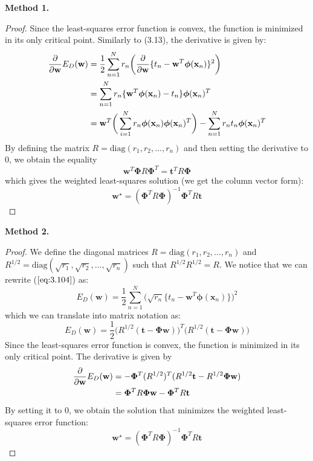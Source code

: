 \vspace{1em}

\textbf{Method 1.}

\begin{proof}
    Since the least-squares error function is convex,
    the function is minimized in its only critical 
    point. Similarly to (3.13), the derivative is given by:
    \begin{align*}
        \pdv{\mathbf{w}} E_D(\mathbf{w})
        &= \frac{1}{2} \sum_{n=1}^{N} r_n \bigg(\pdv{\mathbf{w}} 
        \{t_n - \mathbf{w}^T \bm{\phi}(\mathbf{x}_n)\}^2\bigg) \\
        &= \sum_{n=1}^N r_n \{\mathbf{w}^T \bm{\phi}(\mathbf{x}_n) - t_n\} 
        \bm{\phi}(\mathbf{x}_n)^T \\
        &= \mathbf{w}^T 
        \bigg(\sum_{i=1}^{N} r_n \bm{\phi}(\mathbf{x}_n)
        \bm{\phi}(\mathbf{x}_n)^T\bigg) -
        \sum_{n=1}^{N} r_n t_n \bm{\phi}(\mathbf{x}_n)^T
    \end{align*}
    By defining the matrix $R = \text{diag}(r_1, r_2, \ldots, r_n)$
    and then setting the derivative to 0, we obtain the equality
    \[
        \mathbf{w}^T \mathbf{\Phi}R\mathbf{\Phi}^T
        = \mathbf{t}^TR\mathbf{\Phi} 
    \] 
    which gives the weighted least-squares solution (we get the
    column vector form):
    \[
        \mathbf{w}^\star = (\mathbf{\Phi}^TR\mathbf{\Phi})^{-1} \mathbf{\Phi}^T R \mathbf{t} 
    \] 
\end{proof}

\textbf{Method 2.}
\begin{proof}

    We define the diagonal matrices $R = \text{diag}(r_1, r_2, \ldots, r_n)$ and
    $R^{1/2} = \text{diag}(\sqrt{r_1}, \sqrt{r_2}, \ldots, \sqrt{r_n})$
    such that $R^{1/2}R^{1/2} = R$. We notice that we can rewrite ($\ref{eq:3.104}$) as:
    \[
        E_D(\mathbf{w}) = \frac{1}{2} \sum_{n=1}^{N} 
        \big(\sqrt{r_n}\{t_n - \mathbf{w}^T \bm{\phi}(\mathbf{x}_n)\}\big)^2
    \] 
    which we can translate into matrix notation as:
    \[
        E_D(\mathbf{w}) = \frac{1}{2} \big(R^{1/2}(\mathbf{t} - \mathbf{\Phi}\mathbf{w})\big)^T
        \big(R^{1/2}(\mathbf{t} - \mathbf{\Phi}\mathbf{w})\big)
    \] 
    Since the least-squares error function is convex, the function
    is minimized in its only critical point. The derivative is given by
    \begin{align*}
        \pdv{\mathbf{w}} E_D(\mathbf{w})
        &= -\mathbf{\Phi}^T(R^{1/2})^T(R^{1/2}\mathbf{t} - R^{1/2}\mathbf{\Phi}\mathbf{w}) \\
        &= \mathbf{\Phi}^TR\mathbf{\Phi}\mathbf{w} - \mathbf{\Phi}^TR\mathbf{t}
    \end{align*}
    By setting it to 0, we obtain the solution that minimizes the weighted
    least-squares error function:
    \[
        \mathbf{w}^\star = (\mathbf{\Phi}^TR\mathbf{\Phi})^{-1} \mathbf{\Phi}^T R \mathbf{t} 
    \] 
\end{proof}

